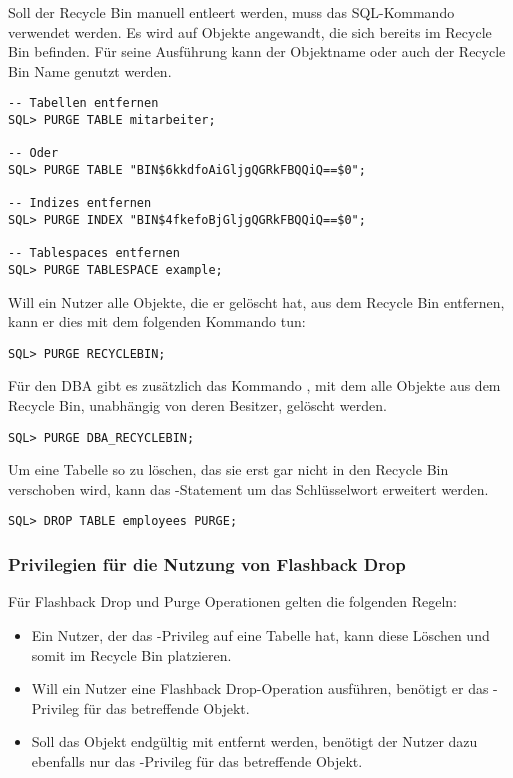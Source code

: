           Soll der Recycle Bin manuell entleert werden, muss das SQL-Kommando  verwendet werden. Es wird auf Objekte angewandt, die sich bereits im Recycle Bin befinden. F\"ur seine Ausf\"uhrung kann der Objektname oder auch der Recycle Bin Name genutzt werden.
          \begin{lstlisting}[caption={Das Kommando \languageorasql{PURGE}},label=admin1717,language=oracle_sql]
-- Tabellen entfernen
SQL> PURGE TABLE mitarbeiter;

-- Oder
SQL> PURGE TABLE "BIN$6kkdfoAiGljgQGRkFBQQiQ==$0";

-- Indizes entfernen
SQL> PURGE INDEX "BIN$4fkefoBjGljgQGRkFBQQiQ==$0";

-- Tablespaces entfernen
SQL> PURGE TABLESPACE example;
          \end{lstlisting}
          Will ein Nutzer alle Objekte, die er gel\"oscht hat, aus dem Recycle Bin entfernen, kann er dies mit dem folgenden Kommando tun:
          \begin{lstlisting}[caption={Das Kommando \languageorasql{PURGE RECYCLEBIN}},label=admin1718,language=oracle_sql]
SQL> PURGE RECYCLEBIN;
          \end{lstlisting}
          F\"ur den DBA gibt es zus\"atzlich das Kommando , mit dem alle Objekte aus dem Recycle Bin, unabh\"angig von deren Besitzer, gel\"oscht werden.
          \begin{lstlisting}[caption={Das Kommando \languageorasql{PURGE DBA_RECYCLEBIN}},label=admin1719,language=oracle_sql]
SQL> PURGE DBA_RECYCLEBIN;
          \end{lstlisting}
          Um eine Tabelle so zu l\"oschen, das sie erst gar nicht in den Recycle Bin verschoben wird, kann das -Statement um das Schl\"usselwort  erweitert werden.
          \begin{lstlisting}[caption={\languageorasql{DROP TABLE PURGE}},label=admin1720,language=oracle_sql]
SQL> DROP TABLE employees PURGE;
          \end{lstlisting}
        \subsubsection{Privilegien f\"ur die Nutzung von Flashback Drop}
          F\"ur Flashback Drop und Purge Operationen gelten die folgenden Regeln:
          \begin{itemize}
            \item Ein Nutzer, der das -Privileg auf eine Tabelle hat, kann diese L\"oschen und somit im Recycle Bin platzieren.
            \item Will ein Nutzer eine Flashback Drop-Operation ausf\"uhren, ben\"otigt er das -Privileg f\"ur das betreffende Objekt.
            \item Soll das Objekt endg\"ultig mit  entfernt werden, ben\"otigt der Nutzer dazu ebenfalls nur das -Privileg f\"ur das betreffende Objekt.
          \end{itemize}
